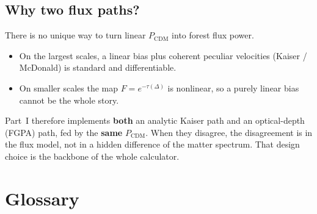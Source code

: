 \documentclass[11pt]{article}
\begin{document}
\subsection{Why two flux paths?}

There is no unique way to turn linear $P_\mathrm{CDM}$ into forest flux power.
\begin{itemize}
\item On the largest scales, a linear bias plus coherent peculiar velocities (Kaiser / McDonald) is standard and differentiable.
\item On smaller scales the map $F=e^{-\tau(\Delta)}$ is nonlinear, so a purely linear bias cannot be the whole story.
\end{itemize}
Part~I therefore implements \textbf{both} an analytic Kaiser path and an optical-depth (FGPA) path, fed by the \textbf{same} $P_\mathrm{CDM}$.
When they disagree, the disagreement is in the flux model, not in a hidden difference of the matter spectrum.
That design choice is the backbone of the whole calculator.

\section{Glossary}
\end{document}
